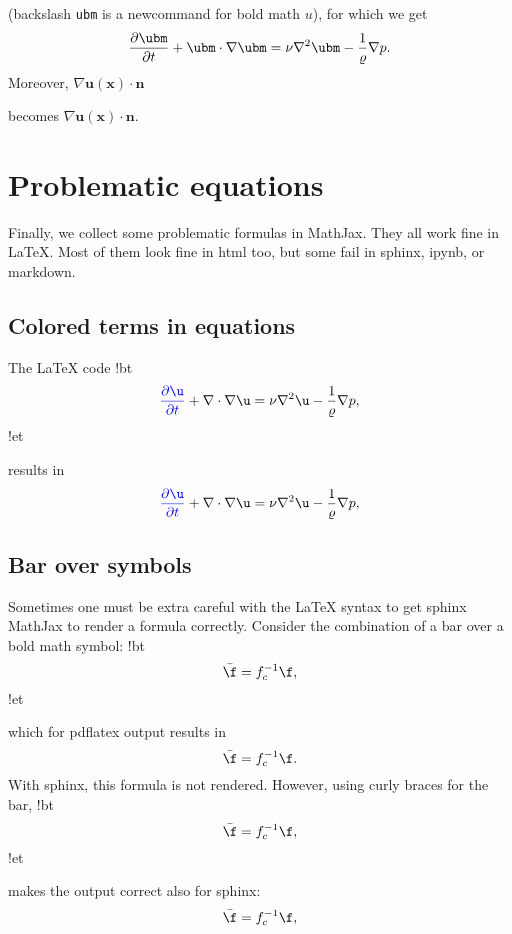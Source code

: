 \documentclass[%
oneside,                 %
final,                   %
10pt]{article}
\begin{document}
\elatexcod

(backslash \texttt{ubm} is a newcommand for bold math $u$), for which we get
\[ \frac{\partial\ubm}{\partial t} +
\ubm\cdot\nabla\ubm = \nu\nabla^2\ubm -
\frac{1}{\varrho}\nabla p.\]
Moreover,
\bccq
$\nabla\bm{u}(\bm{x})\cdot\bm{n}$

\eccq

becomes $\nabla\bm{u}(\bm{x})\cdot\bm{n}$.
\section{Problematic equations}
Finally, we collect some problematic formulas in MathJax. They all work
fine in {\LaTeX}. Most of them look fine in html too, but some fail in
sphinx, ipynb, or markdown.
\subsection{Colored terms in equations}
The {\LaTeX} code
\blatexcod
!bt
\[ {\color{blue}\frac{\partial\u}{\partial t}} +
\nabla\cdot\nabla\u = \nu\nabla^2\u -
\frac{1}{\varrho}\nabla p,\]
!et

\elatexcod

results in
\[ {\color{blue}\frac{\partial\u}{\partial t}} +
\nabla\cdot\nabla\u = \nu\nabla^2\u -
\frac{1}{\varrho}\nabla p,\]
\subsection{Bar over symbols}
Sometimes one must be extra careful with the {\LaTeX} syntax to get sphinx MathJax
to render a formula correctly. Consider the combination of a bar over a
bold math symbol:
\blatexcod
!bt
\[ \bar\f = f_c^{-1}\f,\]
!et

\elatexcod

which for pdflatex output results in
\[ \bar\f = f_c^{-1}\f.\]
With sphinx, this formula is not rendered. However, using curly braces for the bar,
\blatexcod
!bt
\[ \bar{\f} = f_c^{-1}\f,\]
!et

\elatexcod

makes the output correct also for sphinx:
\[ \bar{\f} = f_c^{-1}\f,\]
\end{document}
